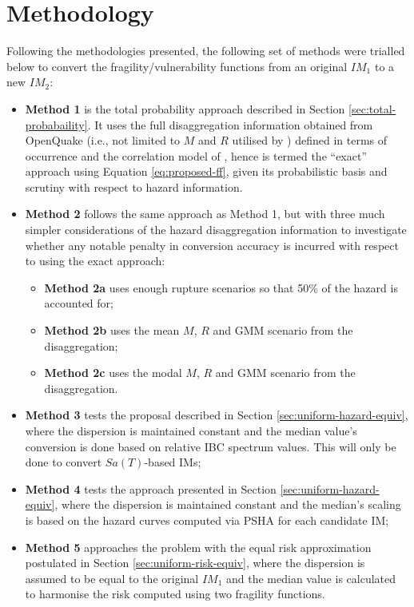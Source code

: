 \section{Methodology}\label{sec:methodology}
Following the methodologies presented, the following set of methods were trialled below to convert the fragility/vulnerability functions from an original $IM_1$ to a new $IM_2$:
\begin{itemize}
    \item \textbf{Method 1} is the total probability approach described in Section \ref{sec:total-probabaility}. It uses the full disaggregation information obtained from OpenQuake (i.e., not limited to $M$ and $R$ utilised by \citet{Suzuki2020}) defined in terms of occurrence and the correlation model of \citet{Aristeidou2025}, hence is termed the ``exact'' approach using Equation \ref{eq:proposed-ff}, given its probabilistic basis and scrutiny with respect to hazard information.
    \item \textbf{Method 2} follows the same approach as Method 1, but with three much simpler considerations of the hazard disaggregation information to investigate whether any notable penalty in conversion accuracy is incurred with respect to using the exact approach:
    \begin{itemize}
        \item \textbf{Method 2a} uses enough rupture scenarios so that 50\% of the hazard is accounted for;
        \item \textbf{Method 2b} uses the mean $M$, $R$ and \ac{GMM} scenario from the disaggregation;
        \item \textbf{Method 2c} uses the modal $M$, $R$ and \ac{GMM} scenario from the disaggregation.
    \end{itemize}
    \item \textbf{Method 3} tests the \citet{Silva2014} proposal described in Section \ref{sec:uniform-hazard-equiv}, where the dispersion is maintained constant and the median value's conversion is done based on relative \ac{IBC} spectrum values. This will only be done to convert $Sa(T)$-based \acp{IM};
    \item \textbf{Method 4} tests the \citet{OReilly2020} approach presented in Section \ref{sec:uniform-hazard-equiv}, where the dispersion is maintained constant and the median's scaling is based on the hazard curves computed via \ac{PSHA} for each candidate \ac{IM};
    \item \textbf{Method 5} approaches the problem with the equal risk approximation postulated in Section \ref{sec:uniform-risk-equiv}, where the dispersion is assumed to be equal to the original $IM_1$ and the median value is calculated to harmonise the risk computed using two fragility functions.
\end{itemize}
